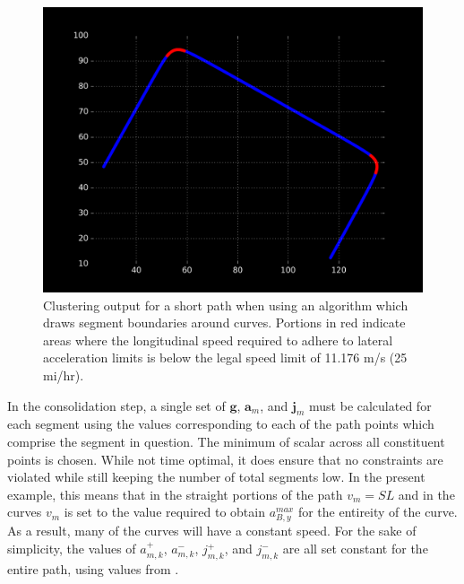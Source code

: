 \documentclass[letterpaper, 10 pt, conference]{ieeeconf}  %
\begin{document}
\begin{figure}[thpb]
  \centering
  \includegraphics[width=0.8\columnwidth]{graphics/course_highlighted_turns.png}
  \caption{Clustering output for a short path when using an algorithm which draws segment boundaries around curves. Portions in red indicate areas where the longitudinal speed required to adhere to lateral acceleration limits is below the legal speed limit of 11.176 m/s (25 mi/hr).}
  \label{fig:course_highlight_turns}
\end{figure}

In the consolidation step, a single set of $\mathbf{g}$, $\mathbf{a}_m$, and $\mathbf{j}_m$ must be calculated for each segment using the values corresponding to each of the path points which comprise the segment in question.
The minimum of scalar across all constituent points is chosen.
While not time optimal, it does ensure that no constraints are violated while still keeping the number of total segments low.
In the present example, this means that in the straight portions of the path $v_m = SL$ and in the curves $v_m$ is set to the value required to obtain $a_{B,y}^{max}$ for the entireity of the curve.
As a result, many of the curves will have a constant speed.
For the sake of simplicity, the values of $a^+_{m,k}$, $a^-_{m,k}$, $j^+_{m,k}$, and $j^-_{m,k}$ are all set constant for the entire path, using values from \cite{Maurya2012,Hoberock1977,Long2000}.
\end{document}
